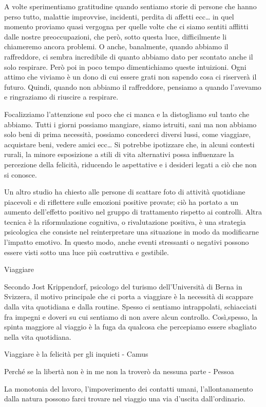 \documentclass[12pt]{book} %
\begin{document}
A volte sperimentiamo gratitudine quando sentiamo storie di persone che hanno perso tutto, malattie improvvise, incidenti,
perdita di affetti ecc… in quel momento proviamo quasi vergogna per quelle volte che ci siamo sentiti afflitti dalle
nostre preoccupazioni, che però, sotto questa luce, difficilmente li chiameremo ancora problemi. O anche,
banalmente, quando abbiamo il raffreddore, ci sembra incredibile di quanto abbiamo dato per scontato anche il solo
respirare. Però poi in poco tempo dimentichiamo queste intuizioni. Ogni attimo che viviamo è un dono di cui
essere grati non sapendo cosa ci riserverà il futuro. Quindi, quando non abbiamo il raffreddore, pensiamo a quando l'avevamo e ringraziamo di riuscire a respirare.

Focalizziamo l'attenzione sul poco che ci manca e la distogliamo sul tanto che abbiamo. Tutti i
giorni possiamo mangiare, siamo istruiti, sani ma non abbiamo solo beni di prima necessità, possiamo concederci diversi
lussi, come viaggiare, acquistare beni, vedere amici ecc…
Si potrebbe ipotizzare che, in alcuni contesti rurali, la minore esposizione a stili di vita alternativi possa influenzare la percezione della felicità, riducendo le aspettative e i desideri legati a ciò che non si conosce.

Un altro studio ha chiesto alle persone di scattare foto di attività quotidiane piacevoli e di riflettere sulle emozioni positive provate; ciò ha portato a un aumento dell'effetto positivo nel gruppo di trattamento rispetto ai controlli.
Altra tecnica è la riformulazione cognitiva, o rivalutazione positiva, è una strategia psicologica che consiste nel reinterpretare una situazione in modo da modificarne l’impatto emotivo. In questo modo, anche eventi stressanti o negativi possono essere visti sotto una luce più costruttiva e gestibile.

\begin{mdframed}[linewidth=1pt]
Viaggiare

Secondo Jost Krippendorf, psicologo del turismo dell'Università di Berna in Svizzera, il motivo principale che ci porta
a viaggiare è la necessità di scappare dalla vita quotidiana e dalla routine. Spesso ci sentiamo intrappolati,
schiacciati fra impegni e doveri su cui sentiamo di non avere alcun controllo. Così,spesso, la spinta maggiore al viaggio è la
fuga da qualcosa che percepiamo essere sbagliato nella vita quotidiana. 

Viaggiare è la felicità per gli inquieti - Camus

Perché se la libertà non è in me non la troverò da nessuna parte - Pessoa

La monotonia del lavoro, l'impoverimento dei contatti umani, l'allontanamento dalla natura possono farci trovare nel viaggio
una via d'uscita dall'ordinario.
\end{mdframed}
\end{document}
